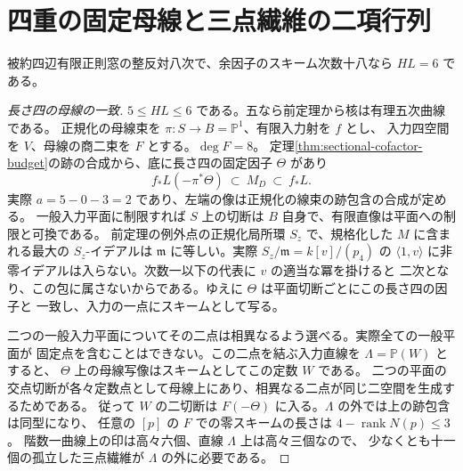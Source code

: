 \section{四重の固定母線と三点繊維の二項行列}
\label{sec:fourfold-fixed-ruling}
\begin{theorem}\label{thm:fourfold-fixed-ruling}
被約四辺有限正則窓の整反対八次で、余因子のスキーム次数十八なら $HL=6$ である。
\end{theorem}
\begin{proof}[長さ四の母線の一致]
$5\le HL\le6$ である。五なら前定理から核は有理五次曲線である。
正規化の母線束を $\pi:S\to B=\mathbb P^1$、有限入力射を $f$ とし、
入力四空間を $V$、母線の商二束を $F$ とする。$\deg F=8$。
定理\ref{thm:sectional-cofactor-budget}の跡の合成から、底に長さ四の固定因子 $\Theta$ があり
\[
      f_*L(-\pi^*\Theta)\ \subset\ M_D\ \subset\ f_*L .
\]
実際 $a=5-0-3=2$ であり、左端の像は正規化の線束の跡包含の合成が定める。
一般入力平面に制限すれば $S$ 上の切断は $B$ 自身で、有限直像は平面への制限と可換である。
前定理の例外点の正規化局所環 $S_z$ で、規格化した $M$ に含まれる最大の
$S_z$-イデアルは $\mathfrak m$ に等しい。実際 $S_z/\mathfrak m=k[v]/(p_4)$ の
$\langle1,v\rangle$ に非零イデアルは入らない。次数一以下の代表に $v$ の適当な冪を掛けると
二次となり、この包に属さないからである。ゆえに $\Theta$ は平面切断ごとにこの長さ四の因子と
一致し、入力の一点にスキームとして写る。

二つの一般入力平面についてその二点は相異なるよう選べる。実際全ての一般平面が
固定点を含むことはできない。この二点を結ぶ入力直線を $\Lambda=\mathbb P(W)$ とすると、
$\Theta$ 上の母線写像はスキームとしてこの定数 $W$ である。
二つの平面の交点切断が各々定数点として母線上にあり、相異なる二点が同じ二空間を生成するためである。
従って $W$ の二切断は $F(-\Theta)$ に入る。$\Lambda$ の外では上の跡包含は同型になり、
任意の $[p]$ の $F$ での零スキームの長さは $4-\operatorname{rank}N(p)\le3$。
階数一曲線上の印は高々六個、直線 $\Lambda$ 上は高々三個なので、
少なくとも十一個の孤立した三点繊維が $\Lambda$ の外に必要である。

\end{proof}
